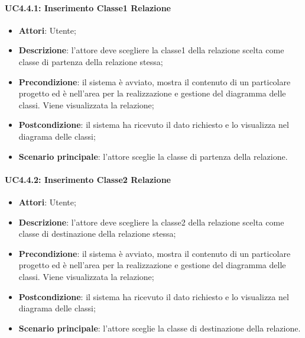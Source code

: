 \paragraph{UC4.4.1: Inserimento Classe1 Relazione}
\label{UC4.4.2}
\begin{itemize}
	\item \textbf{Attori}: Utente;
	\item \textbf{Descrizione}: l'attore deve scegliere la classe1 della relazione scelta come classe di partenza della relazione stessa;
	\item \textbf{Precondizione}: il sistema è avviato, mostra il contenuto di un particolare progetto ed è nell'area per la realizzazione e gestione del diagramma delle classi. Viene visualizzata la relazione;
	\item \textbf{Postcondizione}: il sistema ha ricevuto il dato richiesto e lo visualizza nel diagrama delle classi;
	\item \textbf{Scenario principale}: l'attore sceglie la classe di partenza della relazione.
\end{itemize}

\paragraph{UC4.4.2: Inserimento Classe2 Relazione}
\label{UC4.4.2}
\begin{itemize}
	\item \textbf{Attori}: Utente;
	\item \textbf{Descrizione}: l'attore deve scegliere la classe2 della relazione scelta come classe di destinazione della relazione stessa;
	\item \textbf{Precondizione}: il sistema è avviato, mostra il contenuto di un particolare progetto ed è nell'area per la realizzazione e gestione del diagramma delle classi. Viene visualizzata la relazione;
	\item \textbf{Postcondizione}: il sistema ha ricevuto il dato richiesto e lo visualizza nel diagrama delle classi;
	\item \textbf{Scenario principale}: l'attore sceglie la classe di destinazione della relazione.
\end{itemize}

